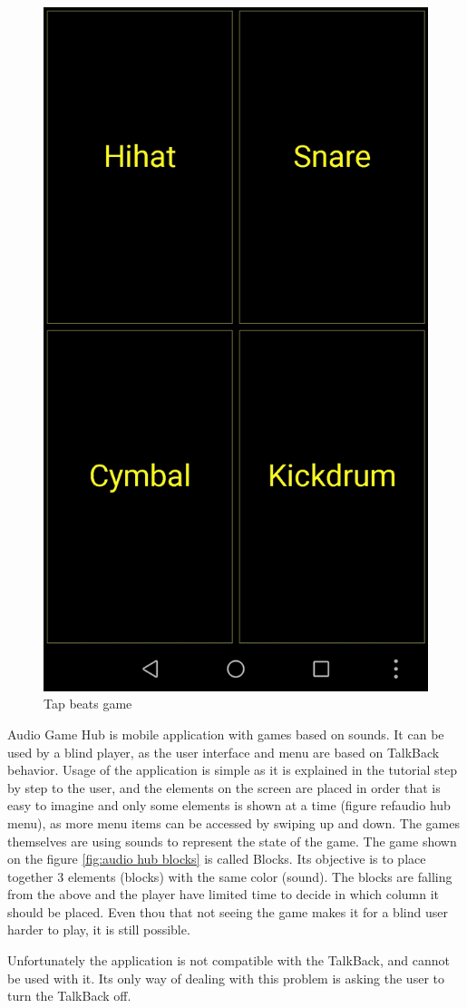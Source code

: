 \documentclass[a4paper,twoside,12pt]{book}
\begin{document}
\begin{figure}[!hb]
\begin{minipage}{.5\textwidth}
  \includegraphics[width=.8\linewidth]{tapbit.jpg}
  \caption{Tap beats game}
  \label{fig:Tap beats game}
\end{minipage}
\end{figure}

\par Audio Game Hub is mobile application with games based on sounds. It can be used by a blind player, as the user interface and menu are based on TalkBack behavior. Usage of the application is simple as it is explained in the tutorial step by step to the user, and the elements on the screen are placed in order that is easy to imagine and only some elements is shown at a time (figure ref{audio hub menu}), as more menu items can be accessed by swiping up and down. The games themselves are using sounds to represent the state of the game. The game shown on the figure \ref{fig:audio hub blocks} is called Blocks. Its objective is to place together 3 elements (blocks) with the same color (sound). The blocks are falling from the above and the player have limited time to decide in which column it should be placed. Even thou that not seeing the game makes it for a blind user harder to play, it is still possible.
\par Unfortunately the application is not compatible with the TalkBack, and cannot be used with it. Its only way of dealing with this problem is asking the user to turn the TalkBack off.
\end{document}

